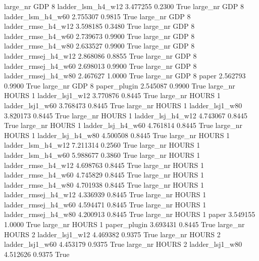   large_nr      GDP                 8   ladder_lsm_h4_w12    3.477255      0.2300    True
  large_nr      GDP                 8   ladder_lsm_h4_w60    2.755307      0.9815    True
  large_nr      GDP                 8  ladder_rmse_h4_w12    3.598185      0.3480    True
  large_nr      GDP                 8  ladder_rmse_h4_w60    2.739673      0.9900    True
  large_nr      GDP                 8  ladder_rmse_h4_w80    2.633527      0.9900    True
  large_nr      GDP                 8 ladder_rmsej_h4_w12    2.868086      0.8855    True
  large_nr      GDP                 8 ladder_rmsej_h4_w60    2.698013      0.9900    True
  large_nr      GDP                 8 ladder_rmsej_h4_w80    2.467627      1.0000    True
  large_nr      GDP                 8               paper    2.562793      0.9900    True
  large_nr      GDP                 8        paper_plugin    2.545087      0.9900    True
  large_nr    HOURS                 1     ladder_lsj1_w12    3.770876      0.8445    True
  large_nr    HOURS                 1     ladder_lsj1_w60    3.768473      0.8445    True
  large_nr    HOURS                 1     ladder_lsj1_w80    3.820173      0.8445    True
  large_nr    HOURS                 1   ladder_lsj_h4_w12    4.743067      0.8445    True
  large_nr    HOURS                 1   ladder_lsj_h4_w60    4.761814      0.8445    True
  large_nr    HOURS                 1   ladder_lsj_h4_w80    4.500508      0.8445    True
  large_nr    HOURS                 1   ladder_lsm_h4_w12    7.211314      0.2560    True
  large_nr    HOURS                 1   ladder_lsm_h4_w60    5.988677      0.3860    True
  large_nr    HOURS                 1  ladder_rmse_h4_w12    4.698763      0.8445    True
  large_nr    HOURS                 1  ladder_rmse_h4_w60    4.745829      0.8445    True
  large_nr    HOURS                 1  ladder_rmse_h4_w80    4.701938      0.8445    True
  large_nr    HOURS                 1 ladder_rmsej_h4_w12    4.336939      0.8445    True
  large_nr    HOURS                 1 ladder_rmsej_h4_w60    4.594471      0.8445    True
  large_nr    HOURS                 1 ladder_rmsej_h4_w80    4.200913      0.8445    True
  large_nr    HOURS                 1               paper    3.549155      1.0000    True
  large_nr    HOURS                 1        paper_plugin    3.693431      0.8445    True
  large_nr    HOURS                 2     ladder_lsj1_w12    4.469382      0.9375    True
  large_nr    HOURS                 2     ladder_lsj1_w60    4.453179      0.9375    True
  large_nr    HOURS                 2     ladder_lsj1_w80    4.512626      0.9375    True
